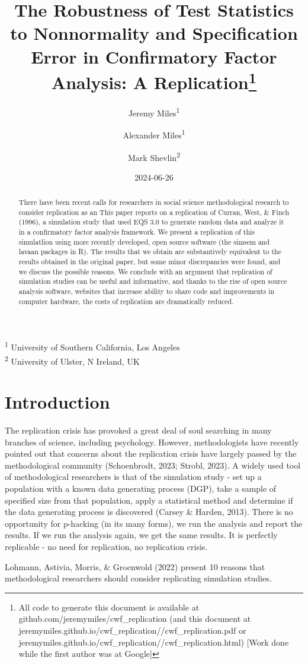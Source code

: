 \documentclass[
  letterpaper,
  DIV=11,
  numbers=noendperiod]{scrartcl}
\title{The Robustness of Test Statistics to Nonnormality and
Specification Error in Confirmatory Factor Analysis: A
Replication\thanks{All code to generate this document is available at
github.com/jeremymiles/cwf\_replication (and this document at
jeremymiles.github.io/cwf\_replication//cwf\_replication.pdf or
jeremymiles.github.io/cwf\_replication//cwf\_replication.html) {[}Work
done while the first author was at Google{]}}}
\author{Jeremy Miles\textsuperscript{1} \and Alexander
Miles\textsuperscript{1} \and Mark Shevlin\textsuperscript{2}}
\date{2024-06-26}
\begin{document}
\maketitle
\begin{abstract}
There have been recent calls for researchers in social science
methodological research to consider replication as an This paper reports
on a replication of Curran, West, \& Finch (1996), a simulation study
that used EQS 3.0 to generate random data and analyze it in a
confirmatory factor analysis framework. We present a replication of this
simulatlion using more recently developed, open source software (the
simsem and lavaan packages in R). The results that we obtain are
substantively equivalent to the results obtained in the original paper,
but some minor discrepancies were found, and we discuss the possible
reasons. We conclude with an argument that replication of simulation
studies can be useful and informative, and thanks to the rise of open
source analysis software, websites that increase ability to share code
and improvements in computer hardware, the costs of replication are
dramatically reduced.
\end{abstract}

\textsuperscript{1} University of Southern California, Los Angeles\\
\textsuperscript{2} University of Ulster, N Ireland, UK

\section{Introduction}\label{introduction}

The replication crisis has provoked a great deal of soul searching in
many branches of science, including psychology. However, methodologists
have recently pointed out that concerns about the replication crisis
have largely passed by the methodological community (Schoenbrodt, 2023;
Strobl, 2023). A widely used tool of methodological researchers is that
of the simulation study - set up a population with a known data
generating process (DGP), take a sample of specified size from that
population, apply a statistical method and determine if the data
generating process is discovered (Carsey \& Harden, 2013). There is no
opportunity for p-hacking (in its many forms), we run the analysis and
report the results. If we run the analysis again, we get the same
results. It is perfectly replicable - no need for replication, no
replication crisis.

Lohmann, Astivia, Morris, \& Groenwold (2022) present 10 reasons that
methodological researchers should consider replicating simulation
studies.
\end{document}
